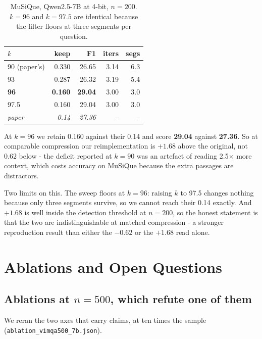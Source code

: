 \documentclass[11pt]{article}
\begin{document}
\begin{table}[htbp]
\centering
\small
\begin{tabular}{lrrrr}
\toprule
$k$ & keep & F1 & iters & segs \\
\midrule
90 (paper's) & 0.330 & 26.65 & 3.14 & 6.3 \\
93 & 0.287 & 26.32 & 3.19 & 5.4 \\
\textbf{96} & \textbf{0.160} & \textbf{29.04} & 3.00 & 3.0 \\
97.5 & 0.160 & 29.04 & 3.00 & 3.0 \\
\midrule
\emph{paper} & \emph{0.14} & \emph{27.36} & -- & -- \\
\bottomrule
\end{tabular}
\caption{MuSiQue, Qwen2.5-7B at 4-bit, $n=200$. $k=96$ and $k=97.5$ are
identical because the filter floors at three segments per question.}
\label{tab:mqk}
\end{table}

At $k=96$ we retain 0.160 against their 0.14 and score \textbf{29.04} against
\textbf{27.36}. So at comparable compression our reimplementation is $+1.68$
above the original, not $0.62$ below - the deficit reported at $k=90$ was an
artefact of reading 2.5$\times$ more context, which costs accuracy on MuSiQue
because the extra passages are distractors.

Two limits on this. The sweep floors at $k=96$: raising $k$ to 97.5 changes
nothing because only three segments survive, so we cannot reach their 0.14
exactly. And $+1.68$ is well inside the detection threshold at $n=200$, so the
honest statement is that the two are indistinguishable at matched compression -
a stronger reproduction result than either the $-0.62$ or the $+1.68$ read alone.

\section{Ablations and Open Questions}

\subsection{Ablations at $n=500$, which refute one of them}
\label{app:abl500}

We reran the two axes that carry claims, at ten times the sample
(\texttt{ablation\_vimqa500\_7b.json}).
\end{document}
